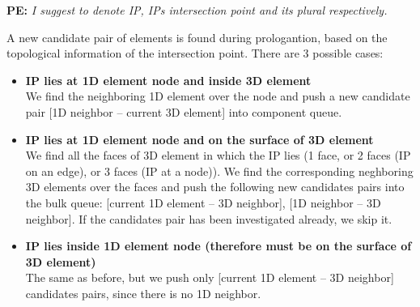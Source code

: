\documentclass{elsarticle}
\newcommand{\notePE}[1]{{\color{Orange} \textbf{PE: } \textit{#1}}}
\begin{document}
\notePE{I suggest to denote IP, IPs intersection point and its plural respectively.}

A new candidate pair of elements is found during prologantion, based on the topological information of the intersection point. There are 3 possible cases:

\begin{itemize}
    \item \textbf{IP lies at 1D element node and inside 3D element} \\
            We find the neighboring 1D element over the node and push a new candidate pair [1D neighbor -- current 3D element] into component queue.
    \item \textbf{IP lies at 1D element node and on the surface of 3D element} \\
            We find all the faces of 3D element in which the IP lies (1 face, or 2 faces (IP on an edge), 
            or 3 faces (IP at a node)). We find the corresponding neghboring 3D elements over the faces and
            push the following new candidates pairs into the bulk queue: [current 1D element -- 3D neighbor], [1D neighbor -- 3D neighbor].
            If the candidates pair has been investigated already, we skip it.
    \item \textbf{IP lies inside 1D element node (therefore must be on the surface of 3D element)} \\
            The same as before, but we push only [current 1D element -- 3D neighbor] candidates pairs, since
            there is no 1D neighbor.
\end{itemize}
\end{document}
